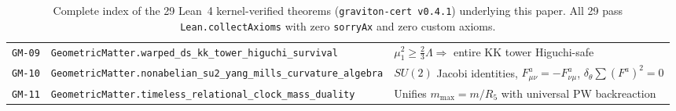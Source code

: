 \documentclass[11pt,a4paper]{article}
\theoremstyle{plain}
\theoremstyle{remark}
\newcommand{\code}[1]{\texttt{\small #1}}
\begin{document}
\begin{table}[t]
\begin{tabular}{@{}l >{\tiny}l >{\raggedright\arraybackslash}p{7.1cm}@{}}
\code{GM-09} & \code{GeometricMatter.warped\_ds\_kk\_tower\_higuchi\_survival} & $\mu_1^2 \ge \tfrac{2}{3}\Lambda \Rightarrow$ entire KK tower Higuchi-safe \\
\code{GM-10} & \code{GeometricMatter.nonabelian\_su2\_yang\_mills\_curvature\_algebra} & 81 $SU(2)$ Jacobi identities, $F^a_{\mu\nu}=-F^a_{\nu\mu}$, $\delta_\theta\sum (F^a)^2=0$ \\
\code{GM-11} & \code{GeometricMatter.timeless\_relational\_clock\_mass\_duality} & Unifies $m_{\max}=m/R_5$ with universal PW backreaction \\
\bottomrule
\end{tabular}
\caption{Complete index of the 29 Lean~4 kernel-verified theorems (\code{graviton-cert v0.4.1}) underlying this paper. All 29 pass \code{Lean.collectAxioms} with zero \code{sorryAx} and zero custom axioms.}
\label{tab:theorems}
\end{table}
\end{document}
